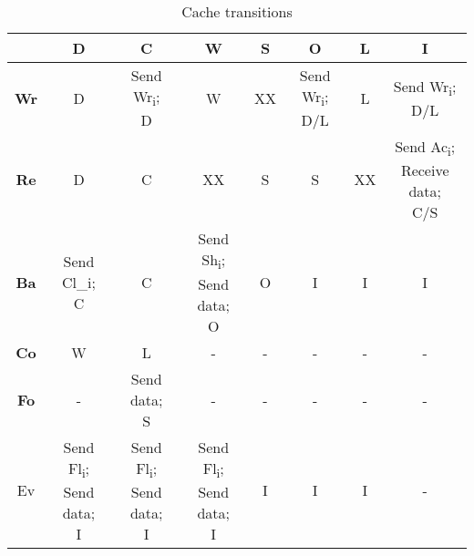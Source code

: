 \documentclass{article}
\begin{document}
\begin{table}[]
\centering
\caption{Cache transitions}
\label{cache-protocol}
\begin{tabular}{|c|c|c|c|c|c|c|c|}
\hline
   & \textbf{D}                        & \textbf{C}                        & \textbf{W}                        & \textbf{S}  & \textbf{O}               & \textbf{L}  & \textbf{I}                             \\ \hline
\textbf{Wr} & D                        & \makecell{Send Wr\textsubscript{i};\\ D}            & W                        & XX & \makecell{Send Wr\textsubscript{i};\\ D/L} & L & \makecell{Send Wr\textsubscript{i};\\ D/L}               \\ \hline
\textbf{Re} & D                        & C                        & XX                       & S  & S               & XX & \makecell{Send Ac\textsubscript{i};\\ Receive data;\\ C/S} \\ \hline
\textbf{Ba} & \makecell{Send Cl\_i;\\ C}            & C                        & \makecell{Send Sh\textsubscript{i};\\ Send data;\\ O} & O  & I               & I  & I                             \\ \hline
\textbf{Co} & W                        & L                        & -                        & -  & -               & -  & -                             \\ \hline
\textbf{Fo} & -                        & \makecell{Send data;\\ S}             & -                        & -  & -               & -  & -                             \\ \hline
Ev & \makecell{Send Fl\textsubscript{i};\\ Send data;\\ I} & \makecell{Send Fl\textsubscript{i};\\ Send data;\\ I} & \makecell{Send Fl\textsubscript{i};\\ Send data;\\ I} & I  & I               & I  & -                             \\ \hline
\end{tabular}
\end{table}
\end{document}
